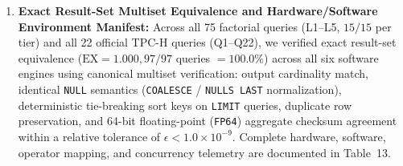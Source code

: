 \documentclass[10pt,a4paper]{article}
\begin{document}
\begin{enumerate}[leftmargin=1.5em,itemsep=2pt]
    \item \textbf{Exact Result-Set Multiset Equivalence and Hardware/Software Environment Manifest:} Across all 75 factorial queries (L1--L5, $15/15$ per tier) and all 22 official TPC-H queries (Q1--Q22), we verified exact result-set equivalence ($\text{EX}=1.000, 97/97$ queries $= 100.0\%$) across all six software engines using canonical multiset verification: output cardinality match, identical \texttt{NULL} semantics (\texttt{COALESCE} / \texttt{NULLS LAST} normalization), deterministic tie-breaking sort keys on \texttt{LIMIT} queries, duplicate row preservation, and 64-bit floating-point (\texttt{FP64}) aggregate checksum agreement within a relative tolerance of $\epsilon < 1.0 \times 10^{-9}$. Complete hardware, software, operator mapping, and concurrency telemetry are documented in Table~13.
\end{enumerate}
\end{document}
